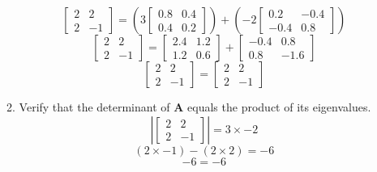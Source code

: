 \documentclass[12pt,a4paper]{paper}
\begin{document}
\begin{enumerate}
\begin{enumerate}
\begin{equation}
\end{equation}
\begin{equation}
\left[\begin{array}{cc}2 & 2 \\ 2 & -1\end{array}\right] = \left(3 \left[\begin{array}{cc}0.8 & 0.4 \\ 0.4 & 0.2\end{array}\right]\right) + \left(-2 \left[\begin{array}{cc}0.2 & -0.4 \\ -0.4 & 0.8\end{array}\right]\right)
\end{equation}
\begin{equation}
\left[\begin{array}{cc}2 & 2 \\ 2 & -1\end{array}\right] = \left[\begin{array}{cc}2.4 & 1.2 \\ 1.2 & 0.6\end{array}\right] + \left[\begin{array}{cc}-0.4 & 0.8 \\ 0.8 & -1.6\end{array}\right]
\end{equation}
\begin{equation}
\left[\begin{array}{cc}2 & 2 \\ 2 & -1\end{array}\right] = \left[\begin{array}{cc}2 & 2 \\ 2 & -1\end{array}\right] 
\end{equation}
\item Verify that the determinant of \textbf{A} equals the product of its eigenvalues.
\begin{equation}
\left|\left[\begin{array}{cc}2 & 2 \\ 2 & -1\end{array}\right]\right| = 3 \times -2
\end{equation}
\begin{equation}
\left(2 \times -1\right)-\left(2 \times 2\right) = -6
\end{equation}
\begin{equation}
-6 = -6
\end{equation}

\end{enumerate}
\end{enumerate}
\end{document}
